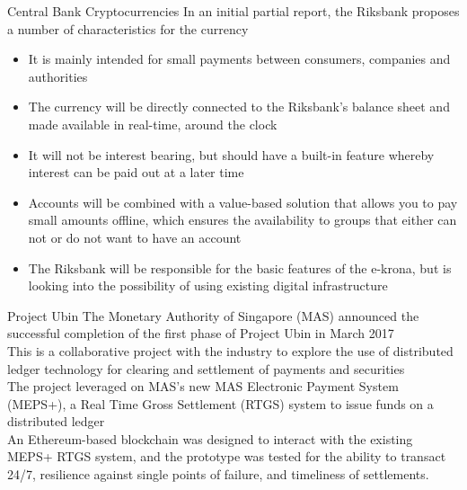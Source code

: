 \documentclass[11pt]{beamer}
\begin{document}
\begin{frame}{Central Bank Cryptocurrencies}
	In an initial partial report, the Riksbank proposes a number of characteristics for the currency
	\begin{itemize}
		\item It is mainly intended for small payments between consumers, companies and authorities
		\item The currency will be directly connected to the Riksbank's balance sheet and made available in real-time, around the clock
		\item It will not be interest bearing, but should have a built-in feature whereby interest can be paid out at a later time
		\item Accounts will be combined with a value-based solution that allows you to pay small amounts offline, which ensures the availability to groups that either can not or do not want to have an account
		\item The Riksbank will be responsible for the basic features of the e-krona, but is looking into the possibility of using existing digital infrastructure
	\end{itemize}
\end{frame}


\begin{frame}{Project Ubin}
	The Monetary Authority of Singapore (MAS) announced the successful completion of the first phase of Project Ubin in March 2017\\ \vspace{3mm}
	This is a collaborative project with the industry to explore the use of distributed ledger technology for clearing and settlement of payments and securities \\ \vspace{3mm}
	The project leveraged on MAS's new MAS Electronic Payment System (MEPS+), a Real Time Gross Settlement (RTGS) system to issue funds on a distributed ledger \\ \vspace{3mm}
	An Ethereum-based blockchain was designed to interact with the existing MEPS+ RTGS system, and the prototype was tested for the ability to transact 24/7, resilience against single points of failure, and timeliness of settlements.
\end{frame}

\end{document}
